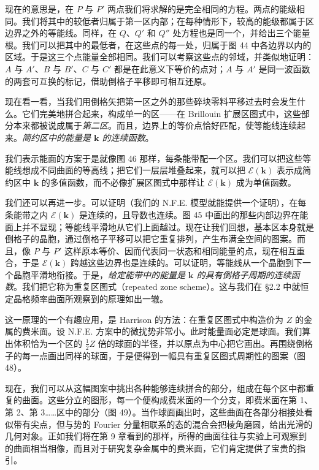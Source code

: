 现在的意思是，在 $P$ 与 $P'$ 两点我们将求解的是完全相同的方程。两点的能级相同。我们将其中的较低者归属于第一区内部；在每种情形下，较高的能级都属于区边界之外的等能线。同样，在 $Q$、$Q'$ 和 $Q''$ 处方程也是同一个，并给出三个能量根。我们可以把其中的最低者，在这些点的每一处，归属于图 44 中各边界以内的区域。于是这三个点能量全部相同。我们可以考察这些点的邻域，并类似地证明：$A$ 与 $A'$、$B$ 与 $B'$、$C$ 与 $C'$ 都是在此意义下等价的点对；$A$ 与 $A'$ 是同一波函数的两套可互换的标记，借助倒格子平移即可相互还原。


现在看一看，当我们用倒格矢把第一区之外的那些碎块零料平移过去时会发生什么。它们完美地拼合起来，构成单一的区——在 Brillouin 扩展区图式中，这些部分本来都被说成属于\emph{第二区}。而且，边界上的等价点恰好匹配，使等能线连续起来。\emph{简约区中的能量是 $\mathbf{k}$ 的连续函数}。

我们表示能面的方案于是就像图 46 那样，每条能带配一个区。我们可以把这些等能线想成不同曲面的等高线；把它们一层层堆叠起来，就可以把 $\mathcal{E}(\mathbf{k})$ 表示成简约区中 $\mathbf{k}$ 的多值函数，而不必像扩展区图式中那样让 $\mathcal{E}(\mathbf{k})$ 成为单值函数。

我们还可以再进一步。可以证明（我们的 N.F.E. 模型就能提供一个证明），在每条能带之内 $\mathcal{E}(\mathbf{k})$ 是连续的，且导数也连续。图 45 中画出的那些内部边界在能面上并不显现；等能线平滑地从它们上面越过。现在让我们回想，基本区本身就是倒格子的晶胞，通过倒格子平移可以把它重复排列，产生布满全空间的图案。而且，像 $P$ 与 $P'$ 这样原本等价、因而代表同一状态和相同能量的点，现在相互重合，于是 $\mathcal{E}(\mathbf{k})$ 跨越这些边界也是连续的。可以证明，等能线从一个晶胞到下一个晶胞平滑地衔接。于是，\emph{给定能带中的能量是 $\mathbf{k}$ 的具有倒格子周期的连续函数}。我们把它称为重复区图式（repeated zone scheme）。这与我们在 §2.2 中就恒定晶格频率曲面所观察到的原理如出一辙。



这一原理的一个有趣应用，是 Harrison 的方法：在重复区图式中构造价为 $Z$ 的金属的费米面。设 N.F.E. 方案中的微扰势非常小。此时能量面必定是球面。我们算出体积恰为一个区的 $\frac{1}{2}Z$ 倍的球面的半径，并以原点为中心把它画出。再围绕倒格子的每一点画出同样的球面，于是便得到一幅具有重复区图式周期性的图案（图 48）。

现在，我们可以从这幅图案中挑出各种能够连续拼合的部分，组成在每个区中都重复的曲面。这些分立的图形，每一个便构成费米面的一个分支，即费米面在第 1、第 2、第 3……区中的部分（图 49）。当作球面画出时，这些曲面在各部分相接处看似带有尖点，但与势的 Fourier 分量相联系的态的混合会把棱角磨圆，给出光滑的几何对象。正如我们将在第 9 章看到的那样，所得的曲面往往与实验上可观察到的曲面相当相像，而且对于研究复杂金属中的费米面，它们肯定提供了宝贵的指引。

